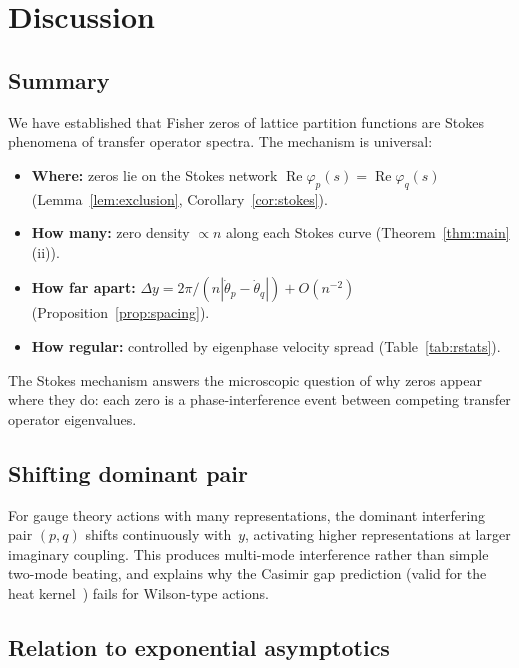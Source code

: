 \documentclass[12pt]{article}
\theoremstyle{definition}
\theoremstyle{remark}
\newcommand{\re}{\operatorname{Re}}
\begin{document}
\section{Discussion}
\label{sec:discussion}

\subsection{Summary}

We have established that Fisher zeros of lattice partition functions
are Stokes phenomena of transfer operator spectra.  The mechanism
is universal:
\begin{itemize}
\item \textbf{Where:} zeros lie on the Stokes network
  $\re\varphi_p(s) = \re\varphi_q(s)$ (Lemma~\ref{lem:exclusion},
  Corollary~\ref{cor:stokes}).
\item \textbf{How many:} zero density $\propto n$ along each Stokes
  curve (Theorem~\ref{thm:main}(ii)).
\item \textbf{How far apart:}
  $\Delta y = 2\pi/(n|\dot\theta_p - \dot\theta_q|) + O(n^{-2})$
  (Proposition~\ref{prop:spacing}).
\item \textbf{How regular:} controlled by eigenphase velocity spread
  (Table~\ref{tab:rstats}).
\end{itemize}

The Stokes mechanism answers the microscopic question of why zeros
appear where they do: each zero is a phase-interference event
between competing transfer operator eigenvalues.

\subsection{Shifting dominant pair}

For gauge theory actions with many representations, the dominant
interfering pair $(p, q)$ shifts continuously with~$y$, activating
higher representations at larger imaginary coupling.  This
produces multi-mode interference rather than simple two-mode
beating, and explains why the Casimir gap prediction (valid for the
heat kernel~\cite{HeatKernel}) fails for Wilson-type actions.

\subsection{Relation to exponential asymptotics}
\end{document}
